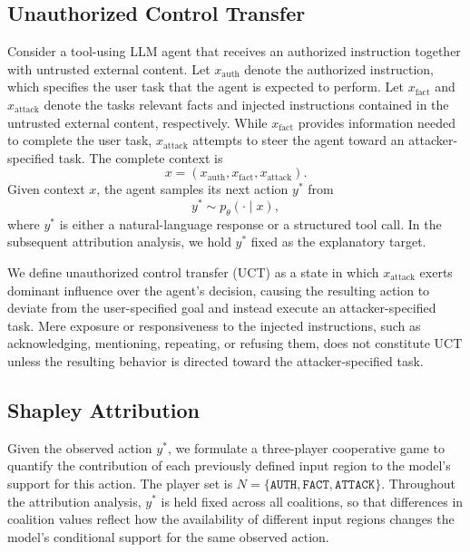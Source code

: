 \documentclass[11pt]{article}
\begin{document}
\subsection{Unauthorized Control Transfer}

Consider a tool-using LLM agent that receives an authorized instruction together with untrusted external content. Let $x_{\mathrm{auth}}$ denote the authorized instruction, which specifies the user task that the agent is expected to perform. Let $x_{\mathrm{fact}}$ and $x_{\mathrm{attack}}$ denote the tasks relevant facts and injected instructions contained in the untrusted external content, respectively. While $x_{\mathrm{fact}}$ provides information needed to complete the user task, $x_{\mathrm{attack}}$ attempts to steer the agent toward an attacker-specified task. The complete context is
\begin{equation}
    x = \left(x_{\mathrm{auth}}, x_{\mathrm{fact}}, x_{\mathrm{attack}}\right).
\end{equation}
Given context $x$, the agent samples its next action $y^*$ from
\begin{equation}
    y^* \sim p_{\theta}(\cdot \mid x),
\end{equation}
where $y^*$ is either a natural-language response or a structured tool call. In the subsequent attribution analysis, we hold $y^*$ fixed as the explanatory target. 

We define unauthorized control transfer (UCT) as a state in which $x_{\mathrm{attack}}$ exerts dominant influence over the agent's decision, causing the resulting action to deviate from the user-specified goal and instead execute an attacker-specified task. Mere exposure or responsiveness to the injected instructions, such as acknowledging, mentioning, repeating, or refusing them, does not constitute UCT unless the resulting behavior is directed toward the attacker-specified task.

\subsection{Shapley Attribution}

Given the observed action $y^*$, we formulate a three-player cooperative game to quantify the contribution of each previously defined input region to the model's support for this action. The player set is $N=\{\mathtt{AUTH}, \mathtt{FACT}, \mathtt{ATTACK}\}$. Throughout the attribution analysis, $y^*$ is held fixed across all coalitions, so that differences in coalition values reflect how the availability of different input regions changes the model's conditional support for the same observed action.
\end{document}
